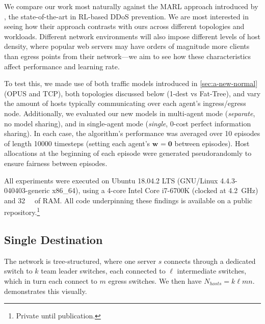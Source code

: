 \documentclass[10pt, times, comsoc]{IEEEtran}
\newcommand{\wvec}[1]{\ensuremath{\bm{w}_{#1}}}
\begin{document}
We compare our work most naturally against the MARL approach introduced by \textcite{DBLP:journals/eaai/MalialisK15}, the state-of-the-art in RL-based DDoS prevention.
We are most interested in seeing how their approach contrasts with ours across different topologies and workloads.
Different network environments will also impose different levels of host density, where popular web servers may have orders of magnitude more clients than egress points from their network---we aim to see how these characteristics affect performance and learning rate.

To test this, we made use of both traffic models introduced in \cref{sec:a-new-normal} (OPUS and TCP), both topologies discussed below (1-dest vs Fat-Tree), and vary the amount of hosts typically communicating over each agent's ingress/egress node.
Additionally, we evaluated our new models in multi-agent mode (\emph{separate}, no model sharing), and in single-agent mode (\emph{single}, 0-cost perfect information sharing).
In each case, the algorithm's performance was averaged over \num{10} episodes of length \num{10000} timesteps (setting each agent's $\wvec{}=\bm{0}$ between episodes).
Host allocations at the beginning of each episode were generated pseudorandomly to ensure fairness between episodes.

All experiments were executed on Ubuntu 18.04.2 LTS (GNU/Linux 4.4.3-040403-generic x86\_64), using a 4-core Intel Core i7-6700K (clocked at \SI{4.2}{\giga\hertz}) and \SI{32}{\gibi\byte} of RAM.
All code underpinning these findings is available on a public repository.\footnote{Private until publication.}

\subsection{Single Destination}\label{sec:single-dest}
The network is tree-structured, where one server $s$ connects through a dedicated switch to $k$ team leader switches, each connected to $\ell$ intermediate switches, which in turn each connect to $m$ egress switches.
We then have $N_{\mathit{hosts}} = k \ell m n$.
 demonstrates this visually.

\end{document}
